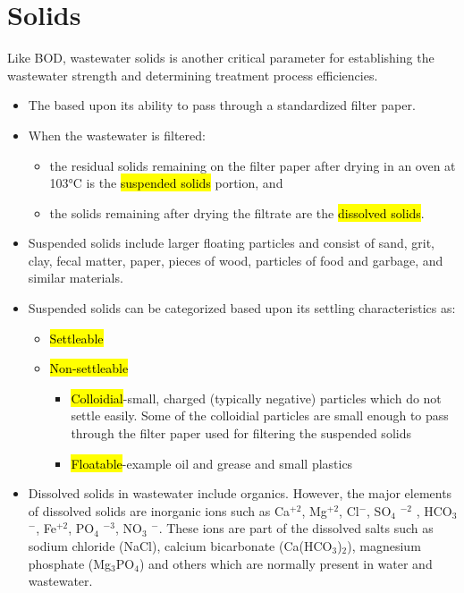 
\chapter{Solids}
		Like BOD, wastewater solids is another critical parameter for establishing the wastewater strength and determining treatment process efficiencies. 
		\begin{itemize}
			\item The  based upon its ability to pass through a standardized filter paper.
			\item When the wastewater is filtered:
			      \begin{itemize}
			      	\item the residual solids remaining on the filter paper after drying in an oven at 103\si{\degree}C is the \hl{suspended solids} portion, and 
			      	\item the solids remaining after drying the filtrate are the \hl{dissolved solids}.
			      \end{itemize}
			\item Suspended solids include larger floating particles and consist of sand, grit, clay, fecal matter, paper, pieces of wood, particles of food and garbage, and similar materials.
			\item Suspended solids can be categorized based upon its settling characteristics as:
			      \begin{itemize}
			      	\item \hl{Settleable}
			      	\item \hl{Non-settleable}
			      	      \begin{itemize}
			      	      	\item \hl{Colloidial}-small, charged (typically negative) particles which do not settle easily.  Some of the colloidial particles are small enough to pass through the filter paper used for filtering the suspended solids
			      	      	\item \hl{Floatable}-example oil and grease and small plastics
			      	      \end{itemize}
			      \end{itemize}
			\item Dissolved solids in wastewater include organics.  However, the major elements of dissolved solids are inorganic ions such as Ca$^{+2}$, Mg$^{+2}$, Cl$^-$, SO$_4$ $^{-2}$ , HCO$_3$ $^-$, Fe$^{+2}$, PO$_4$ $^{-3}$, NO$_3$ $^-$.  These ions are part of the dissolved salts such as sodium chloride (NaCl), calcium bicarbonate (Ca(HCO$_3$)$_2$), magnesium phosphate (Mg$_3$PO$_4$) and others which are normally present in water and wastewater. 

\end{itemize}
